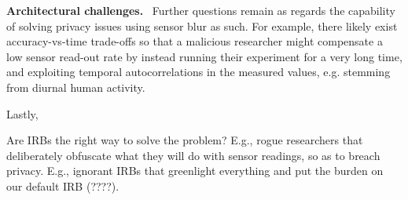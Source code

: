 \textbf{Architectural challenges.}~
Further questions remain as regards the capability of solving privacy 
issues using sensor blur as such. For example, there likely exist 
accuracy-vs-time trade-offs so that a malicious researcher might compensate 
a low sensor read-out rate by instead running their experiment for a 
very long time, and exploiting temporal autocorrelations in the measured 
values, e.g. stemming from diurnal human activity.

Lastly, 

Are IRBs the right way to solve the problem? E.g., 
rogue researchers that deliberately obfuscate what they will 
do with sensor readings, so as to breach privacy. E.g., 
ignorant IRBs that greenlight everything and put the burden on 
our default IRB (????).

